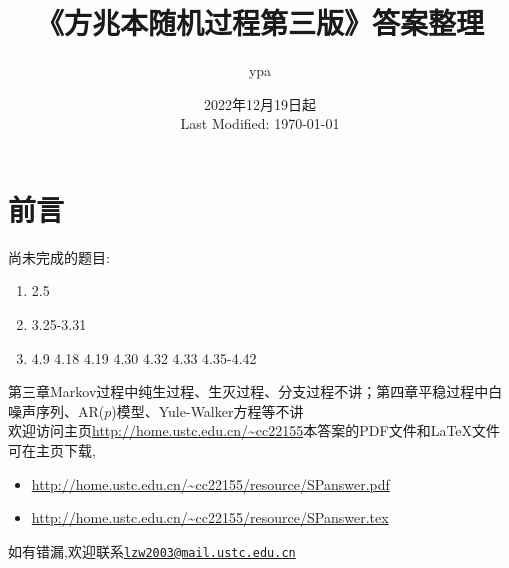 \documentclass{article}
\title{《方兆本随机过程第三版》答案整理}
\author{ypa}
\date{2022年12月19日起\\ Last Modified: \today}
\begin{document}
\maketitle

\setcounter{section}{-1}
\section{前言}
\noindent{}尚未完成的题目:
\begin{enumerate}[label=(\chinese*)]\vspace{-1em}
  \item 2.5\vspace{-1em}
  \item 3.25-3.31\vspace{-1em}
  \item 4.9 4.18 4.19 4.30 4.32 4.33 4.35-4.42\vspace{-1em}
\end{enumerate}
第三章Markov过程中纯生过程、生灭过程、分支过程不讲；第四章平稳过程中白噪声序列、AR($p$)模型、Yule-Walker方程等不讲\\
欢迎访问主页\url{http://home.ustc.edu.cn/~cc22155}\quad 本答案的PDF文件和LaTeX文件可在主页下载,\vspace{-1em}
\begin{itemize}
  \item \url{http://home.ustc.edu.cn/~cc22155/resource/SPanswer.pdf}\vspace{-1em}
	\item \url{http://home.ustc.edu.cn/~cc22155/resource/SPanswer.tex}
\end{itemize}\vspace{-1em}
如有错漏,欢迎联系\href{mailto:lzw2003@mail.ustc.edu.cn}{\texttt{lzw2003@mail.ustc.edu.cn}}

\tableofcontents




\end{document}
